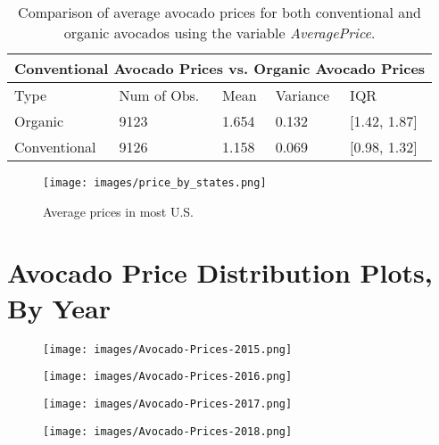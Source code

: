 \documentclass{article}
\begin{document}
\begin{table}[h!]
\centering
\begin{tabular}{|p{2.4 cm}||p{2.4 cm}|p{2.4 cm}|p{2.4 cm}|p{2.4 cm}|}
\hline
 \multicolumn{5}{|c|}{Conventional Avocado Prices vs. Organic Avocado Prices} \\
 \hline
  Type & Num of Obs. & Mean & Variance & IQR \\
 \hline
 Organic & 9123 & 1.654 & 0.132 & [1.42, 1.87]\\
 Conventional & 9126 & 1.158 & 0.069 & [0.98, 1.32]\\
 \hline
\end{tabular}
\caption{Comparison of average avocado prices for both conventional and organic avocados using the variable \textit{AveragePrice}.}
\end{table}

\begin{figure}[h!]
  \centering
  \texttt{[image: images/price\_by\_states.png]}
  \caption{Average prices in most U.S.}\label{Fig:Data3}
\end{figure}

\newpage
\section{Avocado Price Distribution Plots, By Year}
\begin{figure}[!htb]
\begin{minipage}{0.48\textwidth}
    \centering
    \texttt{[image: images/Avocado-Prices-2015.png]}
    \label{Fig:Data5}
\end{minipage}\hfill
\begin{minipage}{0.48\textwidth}
    \centering
     \texttt{[image: images/Avocado-Prices-2016.png]}
    \label{Fig:Data6}
\end{minipage}
\end{figure}

\begin{figure}[!htb]
\begin{minipage}{0.48\textwidth}
    \centering
    \texttt{[image: images/Avocado-Prices-2017.png]}
    \label{Fig:Data5}
\end{minipage}\hfill
\begin{minipage}{0.48\textwidth}
    \centering
     \texttt{[image: images/Avocado-Prices-2018.png]}
    \label{Fig:Data6}
\end{minipage}
\end{figure}
\end{document}
